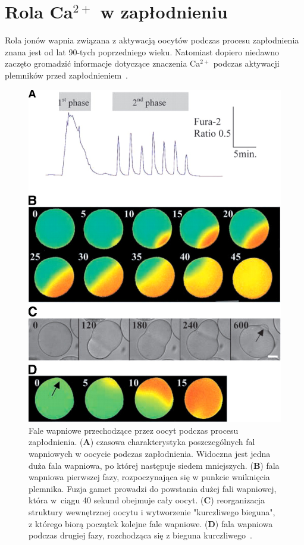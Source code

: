 \FloatBarrier
\section{Rola Ca$^{2+}$ w zapłodnieniu}

Rola jonów wapnia związana z aktywacją oocytów podczas procesu zapłodnienia znana jest od lat 90-tych poprzedniego wieku. Natomiast dopiero niedawno zaczęto gromadzić informacje dotyczące znaczenia Ca$^{2+}$ podczas aktywacji plemników przed zapłodnieniem~\cite{Sardet2007}.

\begin{figure}[tb]
\centering
\includegraphics[scale=0.4]{rysunki/rozdzial_1/zaplodnienie.jpg}
\caption [Fale wapniowe - zapłodnienie]{Fale wapniowe przechodzące przez oocyt podczas procesu zapłodnienia. (\textbf{A}) czasowa charakterystyka poszczególnych fal wapniowych w oocycie podczas zapłodnienia. Widoczna jest jedna duża fala wapniowa, po której następuje siedem mniejszych. (\textbf{B}) fala wapniowa pierwszej fazy, rozpoczynająca się w punkcie wniknięcia plemnika. Fuzja gamet prowadzi do powstania dużej fali wapniowej, która w~ciągu 40 sekund obejmuje cały oocyt. (\textbf{C}) reorganizacja struktury wewnętrznej oocytu i wytworzenie "kurczliwego bieguna", z którego biorą początek kolejne fale wapniowe. (\textbf{D}) fala wapniowa  podczas drugiej fazy, rozchodząca się z bieguna kurczliwego~\cite{Whitaker2006}.}
\label{fig:zaplodnienie}
\end{figure}

